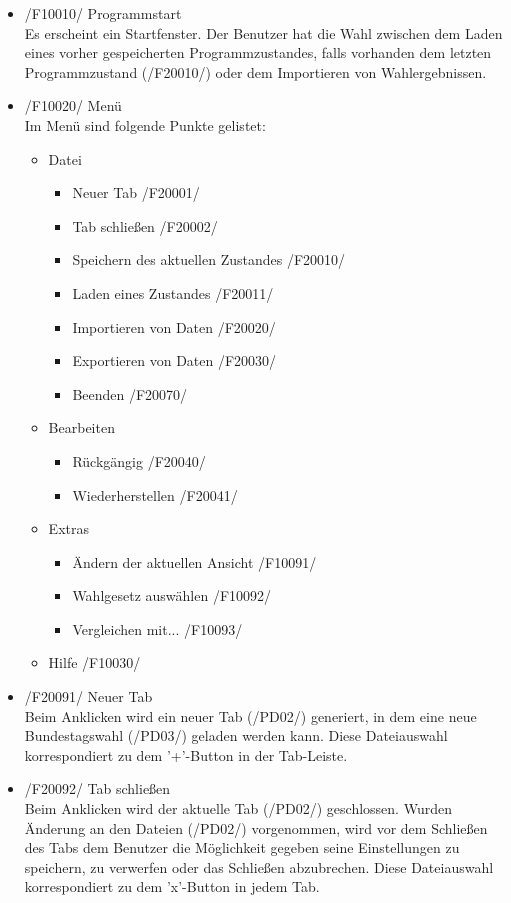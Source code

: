 \documentclass[10pt,a4paper]{article}
\begin{document}
\begin{itemize}
	\item /F10010/ Programmstart \hfill \\
	Es erscheint ein Startfenster. Der Benutzer hat die Wahl zwischen dem Laden eines vorher gespeicherten Programmzustandes, falls vorhanden dem letzten Programmzustand (/F20010/) oder dem Importieren von Wahlergebnissen.
	\item /F10020/ Menü \hfill \\
	Im Menü sind folgende Punkte gelistet:
	\begin{itemize}
		\item Datei
		\begin{itemize}
			\item Neuer Tab /F20001/
			\item Tab schließen /F20002/
			\item Speichern des aktuellen Zustandes /F20010/
			\item Laden eines Zustandes /F20011/
			\item Importieren von Daten /F20020/
			\item Exportieren von Daten /F20030/
			\item Beenden /F20070/
		\end{itemize}
		\item Bearbeiten
		\begin{itemize}
			\item Rückgängig /F20040/
			\item Wiederherstellen /F20041/
		\end{itemize}
		\item Extras
		\begin{itemize}
			\item Ändern der aktuellen Ansicht /F10091/
			\item Wahlgesetz auswählen /F10092/
			\item Vergleichen mit... /F10093/
		\end{itemize}
		\item Hilfe /F10030/
	\end{itemize}
	\item /F20091/ Neuer Tab \hfill \\
	Beim Anklicken wird ein neuer Tab (/PD02/) generiert, in dem eine neue Bundestagswahl (/PD03/) geladen werden kann. Diese Dateiauswahl korrespondiert zu dem '+'-Button in der Tab-Leiste.
	\item /F20092/ Tab schließen \hfill \\
	Beim Anklicken wird der aktuelle Tab (/PD02/) geschlossen. Wurden Änderung an den Dateien (/PD02/) vorgenommen, wird vor dem Schließen des Tabs dem Benutzer die Möglichkeit gegeben seine Einstellungen zu speichern, zu verwerfen oder das Schließen abzubrechen. Diese Dateiauswahl korrespondiert zu dem 'x'-Button in jedem Tab.

\end{itemize}
\end{document}
